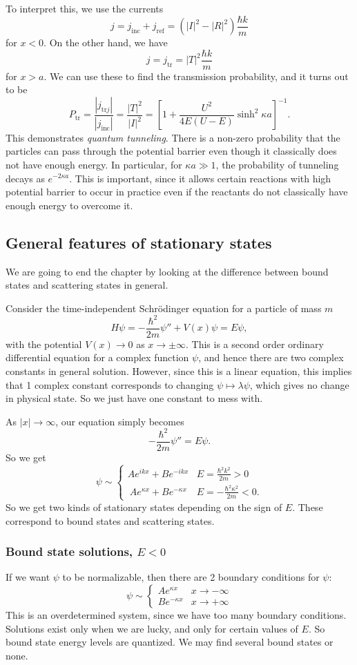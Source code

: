 \documentclass[a4paper]{article}
\begin{document}
To interpret this, we use the currents
\[
  j = j_{\mathrm{inc}} + j_{\mathrm{ref}} = (|I|^2 - |R|^2) \frac{\hbar k}{m}
\]
for $x < 0$. On the other hand, we have
\[
  j = j_{\mathrm{tr}} = |T|^2 \frac{\hbar k}{m}
\]
for $x > a$. We can use these to find the transmission probability, and it turns out to be
\[
  P_{\mathrm{tr}} = \frac{|j_{\mathrm{tr}j}|}{|j_{\mathrm{inc}}|} = \frac{|T|^2}{|I|^2} = \left[1 + \frac{U^2}{4E(U - E)} \sinh^2 \kappa a\right]^{-1}.
\]
This demonstrates \emph{quantum tunneling}. There is a non-zero probability that the particles can pass through the potential barrier even though it classically does not have enough energy. In particular, for $\kappa a \gg 1$, the probability of tunneling decays as $e^{-2\kappa a}$. This is important, since it allows certain reactions with high potential barrier to occur in practice even if the reactants do not classically have enough energy to overcome it.

\subsection{General features of stationary states}
We are going to end the chapter by looking at the difference between bound states and scattering states in general.

Consider the time-independent Schr\"odinger equation for a particle of mass $m$
\[
  H\psi = -\frac{\hbar^2}{2m}\psi'' + V(x) \psi = E\psi,
\]
with the potential $V(x) \to 0$ as $x \to \pm \infty$. This is a second order ordinary differential equation for a complex function $\psi$, and hence there are two complex constants in general solution. However, since this is a linear equation, this implies that 1 complex constant corresponds to changing $\psi \mapsto \lambda \psi$, which gives no change in physical state. So we just have one constant to mess with.

As $|x| \to \infty$, our equation simply becomes
\[
  -\frac{\hbar^2}{2m} \psi'' = E\psi.
\]
So we get
\[
  \psi \sim
  \begin{cases}
    Ae^{ikx} + Be^{-ikx} & E = \frac{\hbar^2 k^2}{2m} > 0\\\
    Ae^{\kappa x} + Be^{-\kappa x} & E = -\frac{\hbar^2 \kappa^2}{2m} < 0.
  \end{cases}
\]
So we get two kinds of stationary states depending on the sign of $E$. These correspond to bound states and scattering states.

\subsubsection*{Bound state solutions, \texorpdfstring{$E < 0$}{E }}
If we want $\psi$ to be normalizable, then there are 2 boundary conditions for $\psi$:
\[
  \psi \sim
  \begin{cases}
    Ae^{\kappa x} & x \to -\infty\\
    B e^{-\kappa x} & x \to +\infty
  \end{cases}
\]
This is an overdetermined system, since we have too many boundary conditions. Solutions exist only when we are lucky, and only for certain values of $E$. So bound state energy levels are quantized. We may find several bound states or none.
\end{document}
